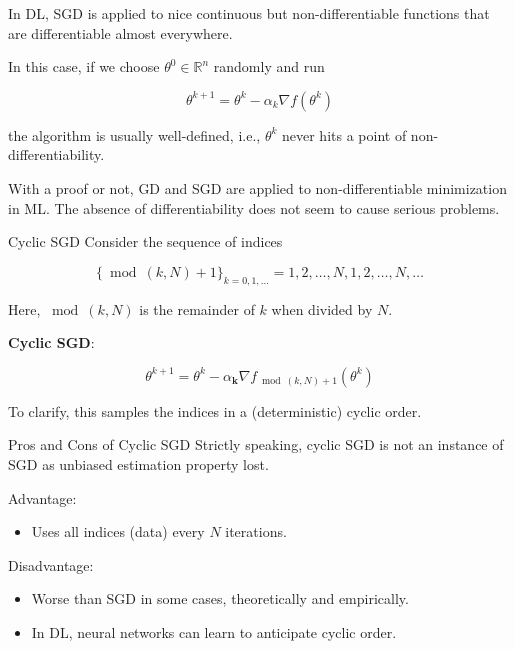 \begin{frame}[allowframebreaks]

In DL, SGD is applied to nice continuous but non-differentiable functions that are differentiable almost everywhere.

In this case, if we choose $\theta^{0} \in \mathbb{R}^{n}$ randomly and run

$$
\theta^{k+1}=\theta^{k}-\alpha_{k} \nabla f\left(\theta^{k}\right)
$$

the algorithm is usually well-defined, i.e., $\theta^{k}$ never hits a point of non-differentiability.

With a proof or not, GD and SGD are applied to non-differentiable minimization in ML. The absence of differentiability does not seem to cause serious problems.

\end{frame}

\begin{frame}[allowframebreaks]

\begin{mydefinitionblock}{2.17}{Cyclic SGD}
    Consider the sequence of indices

    $$
    \{\bmod (k, N)+1\}_{k=0,1, \ldots}=1,2, \ldots, N, 1,2, \ldots, N, \ldots
    $$

    Here, $\bmod (k, N)$ is the remainder of $k$ when divided by $N$.

    \textbf{Cyclic SGD}:

    $$
    \theta^{k+1}=\theta^{k}-\alpha_{\mathbf{k}} \nabla f_{\bmod (k, N)+1}\left(\theta^{k}\right)
    $$

    To clarify, this samples the indices in a (deterministic) cyclic order.
\end{mydefinitionblock}

\end{frame}

\begin{frame}[allowframebreaks]

\begin{myconceptblock}{2.18}{Pros and Cons of Cyclic SGD}
    Strictly speaking, cyclic SGD is not an instance of SGD as unbiased estimation property lost.

    Advantage:

    \begin{itemize}
        \item Uses all indices (data) every $N$ iterations.
    \end{itemize}

    Disadvantage:

    \begin{itemize}
        \item Worse than SGD in some cases, theoretically and empirically.
        \item In DL, neural networks can learn to anticipate cyclic order.
    \end{itemize}
\end{myconceptblock}

\end{frame}

